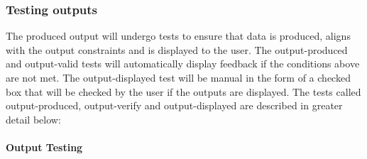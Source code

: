 \documentclass[12pt, titlepage]{article}
\begin{document}
\subsubsection{Testing outputs}

The produced output will undergo tests to ensure that data is produced, aligns 
with the output constraints and is displayed to the user. The output-produced 
and output-valid tests will automatically display feedback if the conditions 
above are not met. The output-displayed test will be manual in the form of a 
checked box that will be checked by the user if the outputs are displayed. The 
tests called output-produced, output-verify and output-displayed are described 
in greater detail below: 
		
\paragraph{Output Testing}
\end{document}
